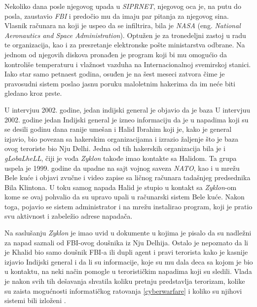 \documentclass[a4paper]{article}
\begin{document}
Nekoliko dana posle njegovog upada u \textit{SIPRNET}, njegovog oca je, na putu do posla, zaustavio \textit{FBI} i predočio mu da imaju par pitanja za njegovog sina. Vlasnik računara na koji je uspeo da se infiltrira, bila je \textit{NASA} (eng. \textit{National Aeronautics and Space Administration}). Optužen je za tronedeljni zastoj u radu te organizacija, kao i za presretanje elektronske pošte ministarstva odbrane. Na jednom od njegovih diskova pronađen je program koji bi mu omogućio da kontroliše temperaturu i vlažnost vazduha na Internacionalnoj svemirskoj stanici. Iako star samo petnaest godina, osuđen je na šest meseci zatvora čime je pravosudni sistem poslao jasnu poruku maloletnim hakerima da im neće biti gledano kroz prste.

U intervjuu 2002. godine, jedan indijski general je objavio da je baza
U intervjuu 2002. godine jedan Indijski general je izneo informaciju da je u napadima koji su se desili godinu dana ranije umešan i Halid Ibrahim koji je, kako je general izjavio, bio povezan sa hakerskim organizacijama i izrazio žaljenje što je baza ovog teroriste bio Nju Delhi. Jedna od tih hakerskih organizacija bila je i \textit{gLobaLheLL}, čiji je vođa \textit{Zyklon} takođe imao kontakte sa Halidom. Ta grupa uspela je 1999. godine da upadne na sajt vojnog saveza \textit{NATO}, kao i u mrežu Bele kuće i objavi zvučne i video zapise sa ličnog računara tadašnjeg predsednika Bila Klintona. U toku samog napada Halid je stupio u kontakt sa \textit{Zyklon}-om kome se ovaj pohvalio da su upravo upali u računarski sistem Bele kuće. Nakon toga, pojavio se sistem administrator i na mrežu instalirao program, koji je pratio svu aktivnost i zabeležio adrese napadača.

Na saslušanju \textit{Zyklon} je imao uvid u dokumente u kojima je pisalo da su nadležni za napad saznali od FBI-ovog doušnika iz Nju Delhija. Ostalo je nepoznato da li je Khalid bio samo doušnik FBI-a ili dupli agent i pravi terorista kako je kasnije izjavio Indijski general i da li su informacije, koje su mu dala deca sa kojom je bio u kontaktu, na neki način pomogle u terorističkim napadima koji su sledili. Vlada je nakon svih tih dešavanja shvatila koliku pretnju predstavlja terorizam, kolike su zaista mogućnosti informatičkog ratovanja \ref{cyberwarfare} i koliko su njihovi sistemi bili izloženi \cite{intrusion}.
\end{document}

